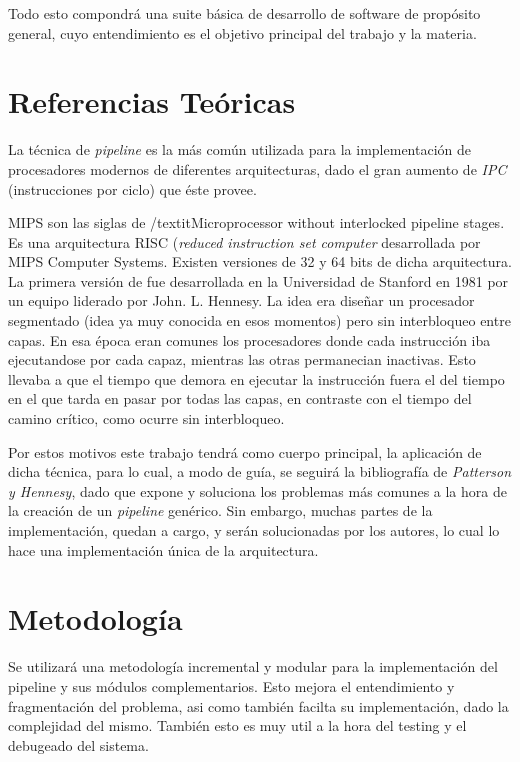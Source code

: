 \documentclass[12pt]{article}
\begin{document}
Todo esto compondrá una suite básica de desarrollo de software de propósito general, cuyo entendimiento es el objetivo principal del trabajo y la materia.


\section{Referencias Teóricas} \label{sec:firstpage}

La técnica de \textit{pipeline} es la más común utilizada para la implementación de procesadores modernos de diferentes arquitecturas, dado el gran aumento de \textit{IPC} (instrucciones por ciclo) que éste provee.

MIPS son las siglas de /textit{Microprocessor without interlocked pipeline stages}. Es una arquitectura RISC (\textit{reduced instruction set computer} desarrollada por MIPS Computer Systems. Existen versiones de 32 y 64 bits de dicha arquitectura. La primera versión de fue desarrollada en la Universidad de Stanford en 1981 por un equipo liderado por John. L. Hennesy. La idea era diseñar un procesador segmentado (idea ya muy conocida en esos momentos) pero sin interbloqueo entre capas. En esa época eran comunes los procesadores donde cada instrucción iba ejecutandose por cada capaz, mientras las otras permanecian inactivas. Esto llevaba a que el tiempo que demora en ejecutar la instrucción fuera el del tiempo en el que tarda en pasar por todas las capas, en contraste con el tiempo del camino crítico, como ocurre sin interbloqueo.

Por estos motivos este trabajo tendrá como cuerpo principal, la aplicación de dicha técnica, para lo cual, a modo de guía, se seguirá la bibliografía de \textit{Patterson y Hennesy}, dado que expone y soluciona los problemas más comunes a la hora de la creación de un \textit{pipeline} genérico. Sin embargo, muchas partes de la implementación, quedan a cargo, y serán solucionadas por los autores, lo cual lo hace una implementación única de la arquitectura.

\section{Metodología}

Se utilizará una metodología incremental y modular para la implementación del pipeline y sus módulos complementarios. Esto mejora el entendimiento y fragmentación del problema, asi como también facilta su implementación, dado la complejidad del mismo. También esto es muy util a la hora del testing y el debugeado del sistema.
\end{document}
